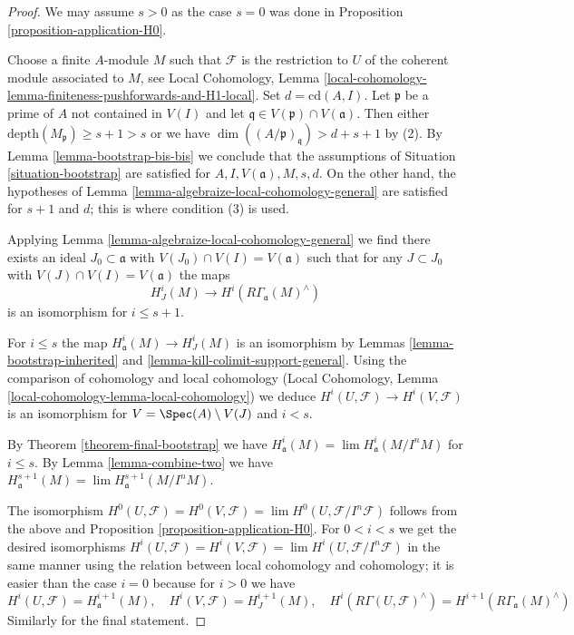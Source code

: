 \begin{proof}
We may assume $s > 0$ as the case $s = 0$ was done in
Proposition \ref{proposition-application-H0}.

\medskip\noindent
Choose a finite $A$-module $M$ such that $\mathcal{F}$ is the restriction
to $U$ of the coherent module associated to $M$, see Local Cohomology,
Lemma \ref{local-cohomology-lemma-finiteness-pushforwards-and-H1-local}.
Set $d = \text{cd}(A, I)$.
Let $\mathfrak p$ be a prime of $A$ not contained in $V(I)$
and let $\mathfrak q \in V(\mathfrak p) \cap V(\mathfrak a)$.
Then either $\text{depth}(M_\mathfrak p) \geq s + 1 > s$
or we have $\dim((A/\mathfrak p)_\mathfrak q) > d + s + 1$ by (2).
By Lemma \ref{lemma-bootstrap-bis-bis} we conclude that the
assumptions of Situation \ref{situation-bootstrap}
are satisfied for $A, I, V(\mathfrak a), M, s, d$.
On the other hand, the hypotheses of
Lemma \ref{lemma-algebraize-local-cohomology-general}
are satisfied for $s + 1$ and $d$; this is where condition (3) is used.

\medskip\noindent
Applying Lemma \ref{lemma-algebraize-local-cohomology-general}
we find there exists an ideal
$J_0 \subset \mathfrak a$ with $V(J_0) \cap V(I) = V(\mathfrak a)$
such that for any $J \subset J_0$ with $V(J) \cap V(I) = V(\mathfrak a)$
the maps
$$
H^i_J(M) \longrightarrow H^i(R\Gamma_\mathfrak a(M)^\wedge)
$$
is an isomorphism for $i \leq s + 1$.

\medskip\noindent
For $i \leq s$ the map $H^i_\mathfrak a(M) \to H^i_J(M)$
is an isomorphism by Lemmas \ref{lemma-bootstrap-inherited} and
\ref{lemma-kill-colimit-support-general}.
Using the comparison of cohomology and local cohomology
(Local Cohomology, Lemma \ref{local-cohomology-lemma-local-cohomology})
we deduce
$H^i(U, \mathcal{F}) \to H^i(V,\mathcal{F})$
is an isomorphism for $V = \Spec(A) \setminus V(J)$ and
$i < s$.

\medskip\noindent
By Theorem \ref{theorem-final-bootstrap} we have
$H^i_\mathfrak a(M) = \lim H^i_\mathfrak a(M/I^nM)$
for $i \leq s$. By Lemma \ref{lemma-combine-two} we have
$H^{s + 1}_\mathfrak a(M) = \lim H^{s + 1}_\mathfrak a(M/I^nM)$.

\medskip\noindent
The isomorphism $H^0(U, \mathcal{F}) = H^0(V, \mathcal{F}) =
\lim H^0(U, \mathcal{F}/I^n\mathcal{F})$ follows from the above and
Proposition \ref{proposition-application-H0}.
For $0 < i < s$ we get the desired isomorphisms
$H^i(U, \mathcal{F}) = H^i(V, \mathcal{F}) =
\lim H^i(U, \mathcal{F}/I^n\mathcal{F})$ in
the same manner using the relation between local cohomology
and cohomology; it is easier than the case $i = 0$
because for $i > 0$ we have
$$
H^i(U, \mathcal{F}) = H^{i + 1}_\mathfrak a(M),
\quad
H^i(V, \mathcal{F}) = H^{i + 1}_J(M),
\quad
H^i(R\Gamma(U, \mathcal{F})^\wedge) = 
H^{i + 1}(R\Gamma_\mathfrak a(M)^\wedge)
$$
Similarly for the final statement.
\end{proof}

